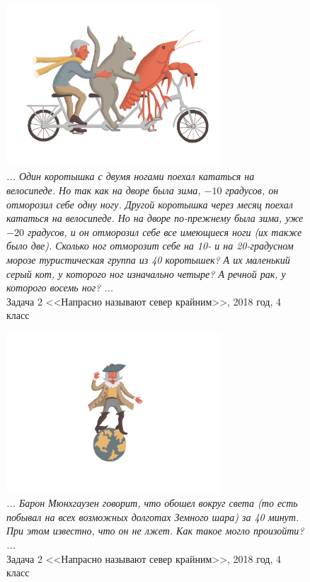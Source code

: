\documentclass[10pt]{scrbook} \usepackage{modules/nonstahp_book}
\begin{document}
\begin{figure} \begin{center}
	\includegraphics[width=8cm]{figures/color/11}
	\caption{
             {\itshape ... Один коротышка с двумя ногами поехал кататься на велосипеде. 
             Но так как на дворе была зима, $-10$ градусов, он отморозил себе одну ногу. 
             Другой коротышка через месяц поехал кататься на велосипеде. Но на дворе по-прежнему 
             была зима, уже $-20$ градусов, и он отморозил себе все имеющиеся ноги (их также было две).
             Сколько ног отморозит себе на 10- и на 20-градусном морозе туристическая группа из 
             40 коротышек? А их маленький серый кот, у которого ног изначально четыре? 
             А речной рак, у которого восемь ног? ...}\\
             {Задача 2 <<Напрасно называют север крайним>>, 2018 год, 4 класс}}
\end{center} \end{figure}

\begin{figure} \begin{center}
	\includegraphics[width=8cm]{figures/color/12}
	\caption{
             {\itshape ... Барон Мюнхгаузен говорит, что обошел вокруг света (то есть побывал на 
              всех возможных долготах Земного шара) за 40 минут. При этом известно, что он не лжет. 
              Как такое могло произойти? ...}\\
             {Задача 2 <<Напрасно называют север крайним>>, 2018 год, 4 класс}}
\end{center} \end{figure}
\end{document}
